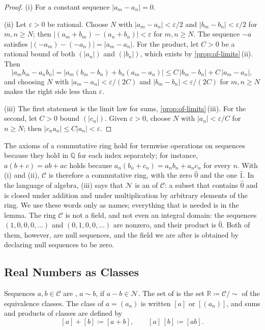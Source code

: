 \begin{proof}
(i) For a constant sequence $|a_m-a_n|=0$.

(ii) Let $\varepsilon>0$ be rational. Choose $N$ with $|a_m-a_n|<\varepsilon/2$ and $|b_m-b_n|<\varepsilon/2$ for $m,n\ge N$; then $|(a_m+b_m)-(a_n+b_n)|<\varepsilon$ for $m,n\ge N$. The sequence $-a$ satisfies $|(-a_m)-(-a_n)|=|a_m-a_n|$. For the product, let $C>0$ be a rational bound of both $(|a_n|)$ and $(|b_n|)$, which exists by \cref{prop:of-limits}\,(ii). Then
\[
|a_mb_m-a_nb_n|=|a_m(b_m-b_n)+b_n(a_m-a_n)|\le C\,|b_m-b_n|+C\,|a_m-a_n| ,
\]
and choosing $N$ with $|a_m-a_n|<\varepsilon/(2C)$ and $|b_m-b_n|<\varepsilon/(2C)$ for $m,n\ge N$ makes the right side less than $\varepsilon$.

(iii) The first statement is the limit law for sums, \cref{prop:of-limits}\,(iii). For the second, let $C>0$ bound $(|c_n|)$. Given $\varepsilon>0$, choose $N$ with $|a_n|<\varepsilon/C$ for $n\ge N$; then $|c_na_n|\le C|a_n|<\varepsilon$.
\end{proof}

The axioms of a commutative ring hold for termwise operations on sequences because they hold in $\mathbb Q$ for each index separately; for instance, $a(b+c)=ab+ac$ holds because $a_n(b_n+c_n)=a_nb_n+a_nc_n$ for every $n$. With (i) and (ii), $\mathcal C$ is therefore a commutative ring, with the zero $\hat0$ and the one $\hat1$. In the language of algebra, (iii) says that $\mathcal N$ is an  of $\mathcal C$: a subset that contains $\hat0$ and is closed under addition and under multiplication by arbitrary elements of the ring. We use these words only as names; everything that is needed is in the lemma. The ring $\mathcal C$ is not a field, and not even an integral domain: the sequences $(1,0,0,0,\ldots)$ and $(0,1,0,0,\ldots)$ are nonzero, and their product is $\hat0$. Both of them, however, are null sequences, and the field we are after is obtained by declaring null sequences to be zero.

\subsection{Real Numbers as Classes}

\begin{definition}
\label{def:real-numbers-cauchy}
Sequences $a,b\in\mathcal C$ are , $a\sim b$, if $a-b\in\mathcal N$. The set of  is the set $\mathbb R\coloneqq\mathcal C/{\sim}$ of the equivalence classes. The class of $a=(a_n)$ is written $[a]$ or $[(a_n)]$, and sums and products of classes are defined by
\[
[a]+[b]\coloneqq[a+b],\qquad[a]\,[b]\coloneqq[ab].
\]
\end{definition}


